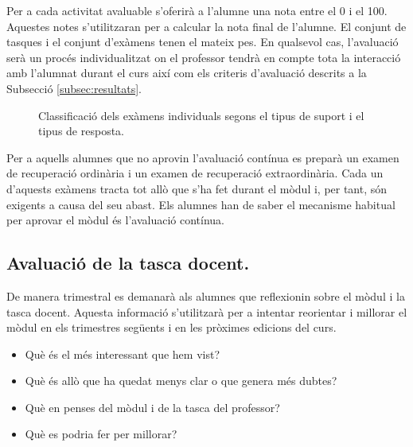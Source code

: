 \documentclass[catalan, a4paper, 12pt, titlepage]{article}
\begin{document}
Per a cada activitat avaluable s'oferirà a l'alumne una nota entre el 0 i el 100.
Aquestes notes s'utilitzaran per a calcular la nota final de l'alumne.
El conjunt de tasques i el conjunt d'exàmens tenen el mateix pes.
En qualsevol cas, l'avaluació serà un procés individualitzat on el professor tendrà en compte tota la interacció amb l'alumnat durant el curs així com els criteris d'avaluació descrits a la Subsecció \ref{subsec:resultats}.

\begin{figure}
\centering
{}
\caption{Classificació dels exàmens individuals segons el tipus de suport i el tipus de resposta.} \label{fig:M1}
\end{figure}

Per a aquells alumnes que no aprovin l'avaluació contínua es preparà un examen de recuperació ordinària i un examen de recuperació extraordinària. Cada un d'aquests exàmens tracta tot allò que s'ha fet durant el mòdul i, per tant, són exigents a causa del seu abast. Els alumnes han de saber el mecanisme habitual per aprovar el mòdul és l'avaluació contínua.

\subsection{Avaluació de la tasca docent.}

De manera trimestral es demanarà als alumnes que reflexionin sobre el mòdul i la tasca docent. Aquesta informació s'utilitzarà per a intentar reorientar i millorar el mòdul en els trimestres següents i en les pròximes edicions del curs. 

\begin{itemize}
	\item Què és el més interessant que hem vist?
	\item Què és allò que ha quedat menys clar o que genera més dubtes?
	\item Què en penses del mòdul i de la tasca del professor?
	\item Què es podria fer per millorar?
\end{itemize}
\end{document}
